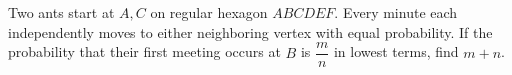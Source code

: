 Two ants start at $A,C$ on regular hexagon $ABCDEF$. Every minute each independently moves to either neighboring vertex with equal probability. If the probability that their first meeting occurs at $B$ is $\dfrac{m}{n}$ in lowest terms, find $m+n$.
